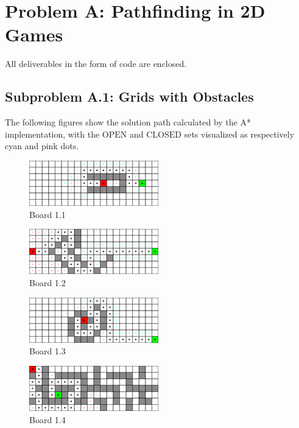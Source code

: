 \section{Problem A: Pathfinding in 2D Games}

All deliverables in the form of code are enclosed.

\subsection*{Subproblem A.1: Grids with Obstacles}

The following figures show the solution path calculated by the A* implementation,
with the $\text{OPEN}$ and $\text{CLOSED}$ sets visualized as respectively cyan
and pink dots.

\begin{figure}[h!]
  \centering
    \includegraphics[width=0.5\textwidth]{img/board-1-1-astar}
    \caption{Board 1.1}
\end{figure}

\begin{figure}[h!]
  \centering
    \includegraphics[width=0.5\textwidth]{img/board-1-2-astar}
    \caption{Board 1.2}
\end{figure}

\begin{figure}[h!]
  \centering
    \includegraphics[width=0.5\textwidth]{img/board-1-3-astar}
    \caption{Board 1.3}
\end{figure}

\begin{figure}[h!]
  \centering
    \includegraphics[width=0.5\textwidth]{img/board-1-4-astar}
    \caption{Board 1.4}
\end{figure}

